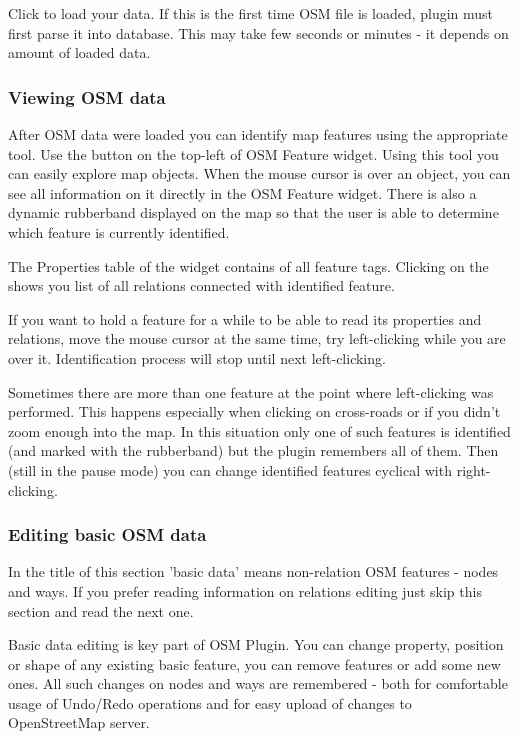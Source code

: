 Click  to load your data. If this is the first time OSM 
file is loaded, plugin must first parse it into database.
This may take few seconds or minutes - it depends on amount of loaded data.

\subsubsection{Viewing OSM data}

After OSM data were loaded you can identify map features using the
appropriate tool. Use the  
button on the top-left of OSM Feature widget. Using this tool you can 
easily explore map objects. When the mouse cursor is over an object, 
you can see all information on it directly in the OSM Feature widget. 
There is also a dynamic rubberband displayed on the map so that the user 
is able to determine which feature is currently identified.

The Properties table of the widget contains of all feature tags. Clicking on 
the  shows you list of all relations connected with
identified feature.

If you want to hold a feature for a while to be able to read its properties 
and relations, move the mouse cursor at the same time, try left-clicking 
while you are over it. Identification process will stop until next 
left-clicking.

Sometimes there are more than one feature at the point where left-clicking
was performed. This happens especially when clicking on cross-roads or if 
you didn't zoom enough into the map. In this situation only one of such 
features is identified (and marked with the rubberband) but the plugin 
remembers all of them. Then (still in the pause mode) you can change 
identified features cyclical with right-clicking.

\subsubsection{Editing basic OSM data}

In the title of this section 'basic data' means non-relation OSM features -
nodes and ways. If you prefer reading information on relations editing just
skip this section and read the next one.
 
Basic data editing is key part of OSM Plugin. You can change property,
position or shape of any existing basic feature, you can remove features or
add some new ones. All such changes on nodes and ways are remembered - both
for comfortable usage of Undo/Redo operations and for easy upload of  changes
to OpenStreetMap server.

